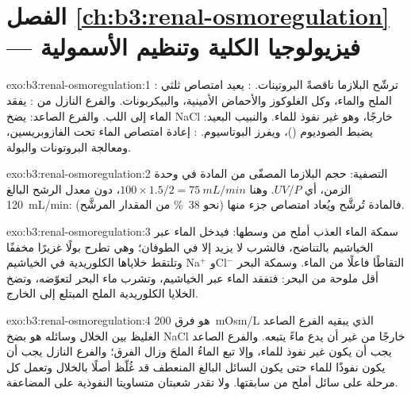 \section*{الفصل \ref{ch:b3:renal-osmoregulation} --- فيزيولوجيا الكلية وتنظيم الأسمولية}

\begin{solution}{exo:b3:renal-osmoregulation:1}
: ترشّح البلازما ناقصةً البروتينات. :
يعيد امتصاص ثلثي الملح والماء، وكل الغلوكوز والأحماض
الأمينية، والبيكربونات. والفرع النازل من : يفقد
الماء إلى اللب. والفرع الصاعد: يضخ NaCl خارجًا، وهو غير نفوذ
للماء. والنبيب البعيد: يضبط الصوديوم ()، ويفرز
البوتاسيوم. : إعادة امتصاص الماء تحت
الفازوبريسين، ومعالجة البروتونات والبولة.
\end{solution}

\begin{solution}{exo:b3:renal-osmoregulation:2}
التصفية: حجم البلازما المصفّى من المادة في وحدة الزمن، أي
$UV/P$. وهنا $100\times 1.5/2 = \qty{75}{mL/min}$، دون معدل الرشح
البالغ \qty{120}{mL/min}: فالمادة تُرشَّح ويُعاد امتصاص جزء
منها (نحو \qty{38}{\%} من المقدار المرشَّح).
\end{solution}

\begin{solution}{exo:b3:renal-osmoregulation:3}
سمكة الماء العذب أملح من وسطها: فيدخل الماء عبر الخياشيم
بالتناضح، فالشرب لا يزيد إلا في الطوفان؛ وهي تطرح بولًا
غزيرًا مخففًا وتلتقط خلاياها الكلوريدية في الخياشيم
Na$^{+}$ وCl$^{-}$ التقاطًا فاعلًا من الماء. وسمكة البحر أقل
ملوحة من البحر: فتفقد الماء عبر الخياشيم، وتشرب ماء البحر
لتعوّضه، وتضخ الخلايا الكلوريدية الملح المبتلع إلى الخارج.
\end{solution}

\begin{solution}{exo:b3:renal-osmoregulation:4}
 هو فرق \qty{200}{mOsm/L} الذي يبقيه الفرع الصاعد
الغليظ بين الخلال وسائله هو بضخ NaCl خارجًا من غير أن يدع
ماءً يتبعه. والفرع الصاعد يجب أن يكون غير نفوذ للماء، وإلا
تبع الماءُ الملحَ وزال الفرق؛ والفرع النازل يجب أن يكون
نفوذًا للماء حتى يكون السائل البالغ المنعطف قد غُلّظ أصلًا
بالخلال وتعمل كل مرحلة على سائل أملح من سابقتها. ولا تقدر
شعبتان متساويتا النفوذية على المضاعفة.
\end{solution}

